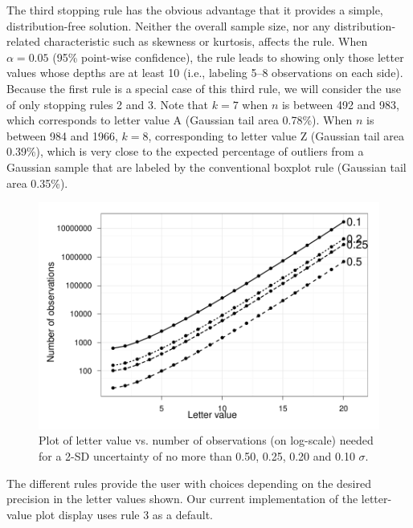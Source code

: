 \documentclass[12pt,oneside]{article}
\begin{document}
\noindent The third stopping rule has the obvious advantage that it provides a simple, distribution-free solution. Neither the overall sample size, nor any distribution-related characteristic such as skewness or kurtosis, affects the rule. When $\alpha = 0.05$ (95\% point-wise confidence), the rule leads to showing only those letter values whose depths are at least 10 (i.e., labeling 5--8 observations on each side). Because the first rule is a special case of this third rule, we will consider the use of only stopping rules 2 and 3. Note that $k = 7$ when $n$ is between 492 and 983, which corresponds to letter value A (Gaussian tail area 0.78\%). When $n$ is between 984 and 1966, $k = 8$, corresponding to letter value Z (Gaussian tail area 0.39\%), which is very close to the expected percentage of outliers from a Gaussian sample that are labeled by the conventional boxplot rule (Gaussian tail area 0.35\%).



\begin{figure}[hbtp]
  \centering
  \includegraphics[width=0.65\linewidth]{letter-val-errors}

  \caption{Plot of letter value vs. number of observations (on log-scale) needed for a 2-SD uncertainty of no more than 0.50, 0.25, 0.20 and 0.10 $\sigma$. }
  \label{fig:lv-error} 
\end{figure}

The different rules provide the user with choices depending on the desired precision in the letter values shown. Our current implementation of the letter-value plot display uses rule 3 as a default.
\end{document}
